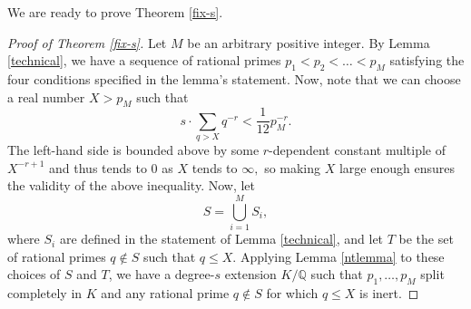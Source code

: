 \documentclass[12pt]{amsart}
\theoremstyle{definition}
\numberwithin{equation}{section}
\newcommand{\Q}{\mathbb{Q}}
\begin{document}
We are ready to prove Theorem \ref{fix-s}.

\begin{proof}[Proof of Theorem \ref{fix-s}]
    Let $M$ be an arbitrary positive integer. By Lemma \ref{technical}, we have a sequence of rational primes $p_1 < p_2 < \dots < p_M$ satisfying the four conditions specified in the lemma's statement. Now, note that we can choose a real number $X > p_M$ such that $$s \cdot \sum_{q > X} q^{-r} < \frac{1}{12} p_M^{-r}.$$ The left-hand side is bounded above by some $r$-dependent constant multiple of $X^{-r+1}$ and thus tends to 0 as $X$ tends to $\infty,$ so making $X$ large enough ensures the validity of the above inequality. 
    Now, let $$S = \bigcup_{i=1}^M S_i,$$ where $S_i$ are defined in the statement of Lemma \ref{technical}, and let $T$ be the set of rational primes $q \not\in S$ such that $q \leq X.$ Applying Lemma \ref{ntlemma} to these choices of $S$ and $T$, we have a degree-$s$ extension $K/\Q$ such that $p_1, \ldots, p_M$ split completely in $K$ and any rational prime $q \not\in S$ for which $q \leq X$ is inert.  


\end{proof}
\end{document}
